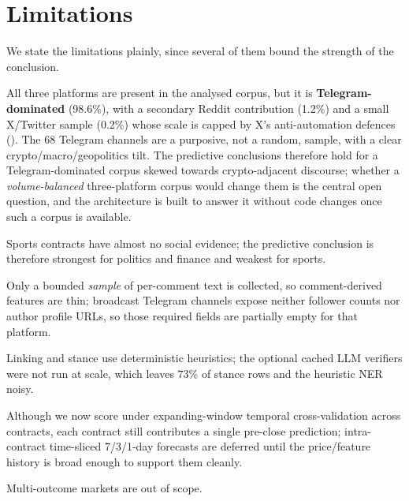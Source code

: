 \section{Limitations}
We state the limitations plainly, since several of them bound the strength of the
conclusion.
\begin{description}[leftmargin=1.4em,style=nextline]
  \item[Platform coverage.] All three platforms are present in the analysed corpus, but
  it is \textbf{Telegram-dominated} (98.6\%), with a secondary Reddit contribution
  (1.2\%) and a small X/Twitter sample (0.2\%) whose scale is capped by X's
  anti-automation defences (). The 68 Telegram channels are a purposive,
  not a random, sample, with a clear crypto/macro/geopolitics tilt. The predictive
  conclusions therefore hold for a Telegram-dominated corpus skewed towards
  crypto-adjacent discourse; whether a \emph{volume-balanced} three-platform corpus would
  change them is the central open question, and the architecture is built to answer it
  without code changes once such a corpus is available.
  \item[Domain coverage.] Sports contracts have almost no social evidence; the
  predictive conclusion is therefore strongest for politics and finance and weakest for
  sports.
  \item[Comments and authors.] Only a bounded \emph{sample} of per-comment text is
  collected, so comment-derived
  features are thin; broadcast Telegram channels expose neither follower counts nor
  author profile URLs, so those required fields are partially empty for that platform.
  \item[Deterministic baselines.] Linking and stance use deterministic heuristics; the
  optional cached LLM verifiers were not run at scale, which leaves $73\%$ of stance
  rows  and the heuristic NER noisy.
  \item[One prediction per contract.] Although we now score under expanding-window
  temporal cross-validation across contracts, each contract still contributes a single
  pre-close prediction; intra-contract time-sliced 7/3/1-day forecasts are deferred until
  the price/feature history is broad enough to support them cleanly.
  \item[Binary contracts only.] Multi-outcome markets are out of scope.
\end{description}

